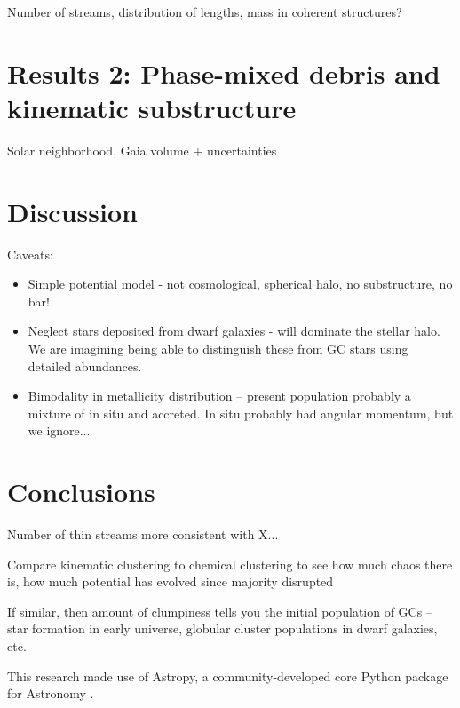 \documentclass[manuscript, letterpaper]{aastex6}
\begin{document}
Number of streams, distribution of lengths, mass in coherent structures?

\section{Results 2: Phase-mixed debris and kinematic substructure}

Solar neighborhood, Gaia volume + uncertainties

\section{Discussion}\label{sec:discussion}

Caveats:
\begin{itemize}
  \item Simple potential model - not cosmological, spherical halo, no
    substructure, no bar!
  \item Neglect stars deposited from dwarf galaxies - will dominate the stellar
    halo. We are imagining being able to distinguish these from GC stars using
    detailed abundances.
  \item Bimodality in metallicity distribution -- present population probably a
    mixture of in situ and accreted. In situ probably had angular momentum, but
    we ignore...
\end{itemize}

\section{Conclusions} \label{sec:conclusions}

Number of thin streams more consistent with X...

Compare kinematic clustering to chemical clustering to see how much chaos there
is, how much potential has evolved since majority disrupted

If similar, then amount of clumpiness tells you the initial population of GCs --
star formation in early universe, globular cluster populations in dwarf
galaxies, etc.

\acknowledgements
This research made use of
Astropy, a community-developed core Python package for Astronomy
\citep{Astropy-Collaboration:2013}.



\end{document}
